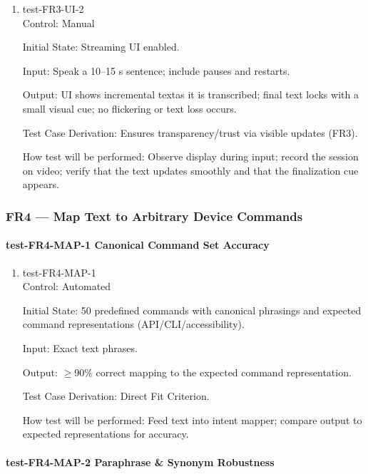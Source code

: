 \documentclass[12pt, titlepage]{article}
\begin{document}
\begin{enumerate}
\item{test-FR3-UI-2\\}
Control: Manual

Initial State: Streaming UI enabled.

Input: Speak a 10–15 s sentence; include pauses and restarts.

Output: UI shows incremental textas it is transcribed; final text locks with a small visual cue; no flickering or text loss occurs.

Test Case Derivation: Ensures transparency/trust via visible updates (FR3).

How test will be performed: Observe display during input; record the session on video; verify that the text updates smoothly and that the finalization cue appears.
\end{enumerate}

\subsubsection{FR4 — Map Text to Arbitrary Device Commands}

\paragraph{test-FR4-MAP-1 Canonical Command Set Accuracy}

\begin{enumerate}
\item{test-FR4-MAP-1\\}
Control: Automated

Initial State: 50 predefined commands with canonical phrasings and expected command representations (API/CLI/accessibility).

Input: Exact text phrases.

Output: $\geq$90\% correct mapping to the expected command representation.

Test Case Derivation: Direct Fit Criterion.

How test will be performed: Feed text into intent mapper; compare output to expected representations for accuracy.
\end{enumerate}

\paragraph{test-FR4-MAP-2 Paraphrase \& Synonym Robustness}
\end{document}
